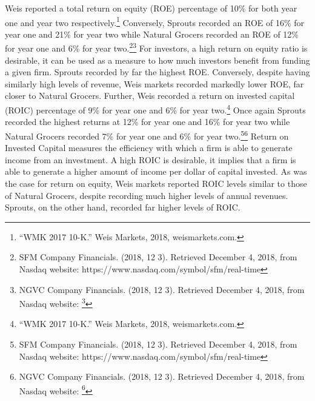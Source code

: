 \documentclass[12pt]{article}
\begin{document}
\begin{doublespacing}
Weis reported a total return on equity (ROE) percentage of 10\% for both year one and year two respectively.\footnote{“WMK 2017 10-K.” Weis Markets, 2018, weismarkets.com.} Conversely, Sprouts recorded an ROE of 16\% for year one and 21\% for year two while Natural Grocers recorded an ROE of 12\% for year one and 6\% for year two.\footnote{SFM Company Financials. (2018, 12 3). Retrieved December 4, 2018, from Nasdaq website: 
     https://www.nasdaq.com/symbol/sfm/real-time }\footnote{NGVC Company Financials. (2018, 12 3). Retrieved December 4, 2018, from Nasdaq website: 
     \footnote{SFM Company Financials. (2018, 12 3). Retrieved December 4, 2018, from Nasdaq 
     website: https://www.nasdaq.com/symbol/sfm/real-time } } For investors, a high return on equity ratio is desirable, it can be used as a measure to how much investors benefit from funding a given firm. Sprouts recorded by far the highest ROE. Conversely, despite having similarly high levels of revenue, Weis markets recorded markedly lower ROE, far closer to Natural Grocers. Further, Weis recorded a return on invested capital (ROIC) percentage of 9\% for year one and 6\% for year two.\footnote{“WMK 2017 10-K.” Weis Markets, 2018, weismarkets.com.} Once again Sprouts recorded the highest returns at 12\% for year one and 16\% for year two while Natural Grocers recorded 7\% for year one and 6\% for year two.\footnote{SFM Company Financials. (2018, 12 3). Retrieved December 4, 2018, from Nasdaq website: 
     https://www.nasdaq.com/symbol/sfm/real-time }\footnote{NGVC Company Financials. (2018, 12 3). Retrieved December 4, 2018, from Nasdaq website: 
     \footnote{SFM Company Financials. (2018, 12 3). Retrieved December 4, 2018, from Nasdaq 
     website: https://www.nasdaq.com/symbol/sfm/real-time } } Return on Invested Capital measures the efficiency with which a firm is able to generate income from an investment. A high ROIC is desirable, it implies that a firm is able to generate a higher amount of income per dollar of capital invested. As was the case for return on equity, Weis markets reported ROIC levels similar to those of Natural Grocers, despite recording much higher levels of annual revenues. Sprouts, on the other hand, recorded far higher levels of ROIC. 


\end{doublespacing}
\end{document}
